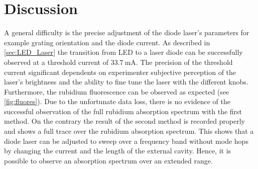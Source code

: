 \newpage
\section{Discussion}
\label{sec:Diskussion}
A general difficulty is the precise adjustment of the diode laser's parameters
for example grating orientation and the diode current.
As described in \ref{sec:LED_Laser}
the transition from LED to a laser diode
can be successfully observed at a threshold current
of $\SI{33,7}{\milli\ampere}$.
The precision of the threshold current significant
dependents on experimenter subjective perception of
the laser's brightness
and the ability to fine tune the laser with the different knobs.
Furthermore, the rubidium fluorescence can be observed
as expected (see \ref{fig:fluores}).
Due to the unfortunate
data loss, there is no evidence of the successful observation of the
full rubidium absorption spectrum with the first method.
On the contrary the result of the second method is
recorded properly and shows a full trace over the rubidium absorption spectrum.
This shows that a diode laser can be
adjusted to sweep over a frequency band without mode hops by changing the current
and the length of the external cavity. Hence, it is possible to observe an
absorption spectrum over an extended range.
